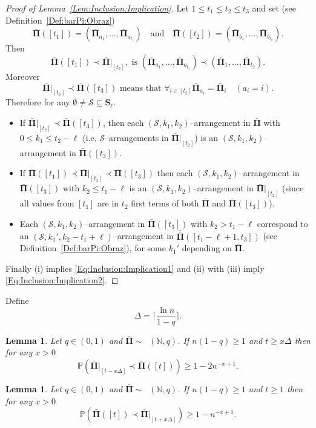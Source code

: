 \documentclass[letterpaper,11pt]{article}
\newtheorem{lemma}[theorem]{Lemma}
\theoremstyle{definition}
\theoremstyle{remark}
\renewcommand{\le}{\leqslant}
\renewcommand{\ge}{\geqslant}
\DeclareMathOperator{\Mallows}{Mallows_{seq}}
\newcommand{\bS}{\mathbf{S}}
\newcommand{\Pra}[1]{\mathbb{P}\left(#1\right)}
\newcommand{\barPi}{\bar {\mathbf \Pi}}
\newcommand{\barbarPi}{{\bar{\bar {\mathbf \Pi}}}}
\newcommand{\NN}{\mathbb{N}}
\newcommand{\cS}{\mathcal{S}}
\newcommand{\subseq}{\prec}
\begin{document}
\begin{proof}[Proof of Lemma~\ref{Lem:Inclusion:Implication}]
	Let $1\le t_1\le t_2\le t_3$ and set (see Definition~\ref{Def:barPi:Obraz})
	\[
	\barPi([t_1])=(\barPi_{a_1},\ldots,\barPi_{a_{t_1}})\quad\text{and}\quad
	\barPi([t_2])=(\barPi_{b_1},\ldots,\barPi_{b_{t_2}}).
	\]
	Then 
	\[\barPi([t_1])\subseq \barPi|_{[t_2]}, \text{ is }(\barPi_{a_1},\ldots,\barPi_{a_{t_1}})\subseq (\barPi_1,\ldots,\barPi_{t_2}).\]
	Moreover
	\[
	\barPi|_{[t_2]}\subseq\barPi([t_3]) \text{ means that } \forall_{i\in [t_2]} \barPi_{a_i}=\barPi_i\quad (a_i=i).\]
	Therefore for any  $\emptyset\neq\cS\subseteq \bS_\ell$.
	\begin{itemize}
		\item[(i)] If $\barPi|_{[t_2]}\subseq \barPi([t_3])$, then each $(\cS,k_1,k_2)$--arrangement in $\barPi$ with $0\le k_1\le t_2-\ell$ (i.e. $\cS$--arrangements in $\barPi|_{[t_2]}$) is an $(\cS,k_1,k_2)$--arrangement in $\barPi([t_3])$. 
		\item[(ii)] If $\barPi([t_1])\subseq \barPi|_{[t_2]}\subseq \barPi([t_3])$ then each $(\cS,k_1,k_2)$--arrangement in $\barPi([t_3])$ with $k_2 \le  t_1-\ell$  is an $(\cS,k_1,k_2)$--arrangement in $\barPi|_{[t_2]}$ (since all values from $[t_1]$ are in $t_2$ first terms of both $\barPi$ and $\barPi([t_3])$).
		\item[(iii)] Each $(\cS,k_1,k_2)$--arrangement in $\barPi([t_3])$ with $k_2 > t_1-\ell$ correspond to an $(\cS,k_1',k_2-t_1+\ell)$--arrangement in $\barbarPi([t_1-\ell+1,t_3])$ (see Definition~\ref{Def:barPi:Obraz}), for some $k_1'$ depending on $\barPi$.
	\end{itemize}
	
	
	Finally (i) implies \eqref{Eq:Inclusion:Implication1}
	and (ii) with (iii) imply \eqref{Eq:Inclusion:Implication2}.
\end{proof}


Define
\begin{equation}
	\label{Eq:Def:Delta}	
	\Delta=\Bigg\lceil \frac{\ln n}{1-q}\Bigg\rceil.
\end{equation}
\begin{lemma}\label{Lem:Inclusion0}
	Let $q\in (0,1)$ and $\barPi\sim\Mallows(\NN,q)$. 
	If $n(1-q)\ge 1$ and $t\ge x\Delta$ then for any $x>0$ 	
	\[
	\Pra{\barPi|_{[t-x\Delta]}\subseq \barPi([t])}\ge 1-2n^{-x+1}.
	\]
\end{lemma}
\begin{lemma}\label{Lem:Inclusion2}
	Let $q\in (0,1)$ and $\barPi\sim\Mallows(\NN,q)$. 
	If $n(1-q)\ge 1$ and $t\ge 1$ then for any $x>0$ 	
	\[\Pra{\barPi([t])\subseq \barPi|_{[t+x\Delta]}}\ge 1-n^{-x+1}.
	\]
\end{lemma}
\end{document}
